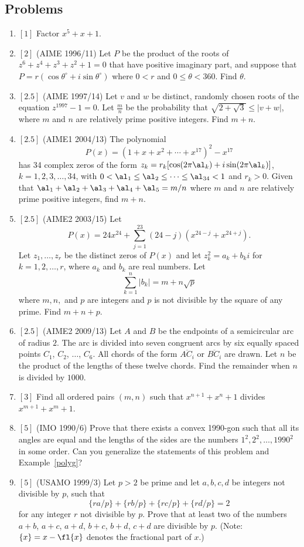 \subsection{Problems}
\begin{enumerate}
\item $[1]$ Factor $x^5+x+1$.
\item $[2]$ (AIME 1996/11) Let $P$ be the product of the roots of $z^6+z^4+z^3+z^2+1=0$ that have positive imaginary part, and suppose that $P=r(\cos \theta^{\circ}+i\sin\theta^{\circ})$ where $0<r$ and $0\leq \theta <360$. Find $\theta$.
\item $[2.5]$ (AIME 1997/14) Let $v$ and $w$ be distinct, randomly chosen roots of the equation $z^{1997}-1=0$. Let $\frac mn$ be the probability that $\sqrt{2+\sqrt 3}\leq |v+w|$, where $m$ and $n$ are relatively prime positive integers. Find $m+n$.
\item $[2.5]$ (AIME1 2004/13)
The polynomial 
\[P(x)=(1+x+x^2+\cdots +x^{17})^2-x^{17}
\]
has 34 complex zeros of the form $z_k=r_k[\cos(2\pi \al_k)+i\sin(2\pi \al_k)]$, $k=1,2,3,\ldots, 34$, with $0<\al_1\leq \al_2\leq \cdots \leq \al_{34}<1$ and $r_k>0$. Given that $\al_1+\al_2+\al_3+\al_4+\al_5=m/n$ where $m$ and $n$ are relatively prime positive integers, find $m+n$.
\item $[2.5]$ (AIME2 2003/15)
Let 
\[P(x)=24x^{24} +\sum_{j=1}^{23} (24-j) (x^{24-j}+x^{24+j}).\]
Let $z_1,\ldots, z_r$ be the distinct zeros of $P(x)$ and let $z_k^2=a_k+b_ki$ for $k=1,2,\ldots, r$, where $a_k$ and $b_k$ are real numbers. Let
\[
\sum_{k=1}^n|b_k|=m+n\sqrt{p}
\]
where $m,n,$ and $p$ are integers and $p$ is not divisible by the square of any prime. Find $m+n+p$.
\item $[2.5]$ (AIME2 2009/13) Let $A$ and $B$ be the endpoints of a semicircular arc of radius $2$. The arc is divided into seven congruent arcs by six equally spaced points $C_1$, $C_2$, $\dots$, $C_6$. All chords of the form $\overline {AC_i}$ or $\overline {BC_i}$ are drawn. Let $n$ be the product of the lengths of these twelve chords. Find the remainder when $n$ is divided by $1000$.
\item $[3]$  Find all ordered pairs $(m,n)$ such that $x^{n+1}+x^n+1$ divides $x^{m+1}+x^m+1$.
\item $[5]$ (IMO 1990/6) Prove that there exists a convex 1990-gon such that all its angles are equal and the lengths of the sides are the numbers $1^2,2^2,\ldots, 1990^2$ in some order. Can you generalize the statements of this problem and Example~\ref{polyg}?
\item $[5]$ (USAMO 1999/3) Let $p>2$ be prime and let $a,b,c,d$ be integers not divisible by $p$, such that
\[
\{ra/p\}+\{rb/p\}+\{rc/p\}+\{rd/p\}=2
\]
for any integer $r$ not divisible by $p$. Prove that at least two of the numbers $a+b$, $a+c$, $a+d$, $b+c$, $b+d$, $c+d$ are divisible by $p$. (Note: $\{x\}=x-\fl{x}$ denotes the fractional part of $x$.)
\end{enumerate}

